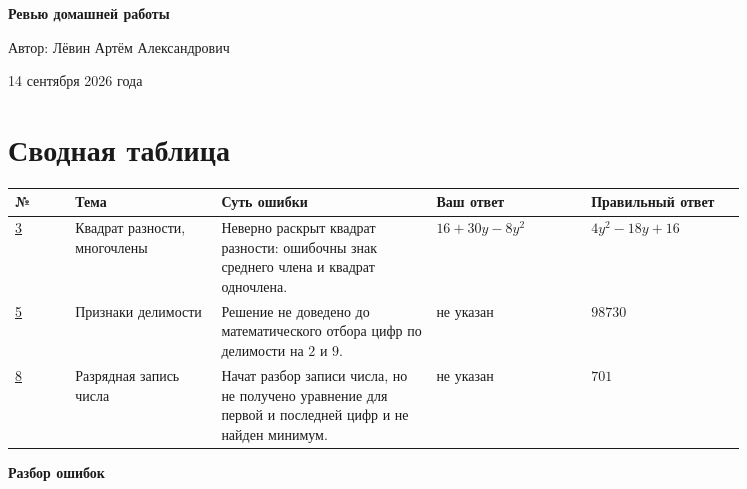 \documentclass[12pt,a4paper]{article}
\begin{document}
\hypersetup{pageanchor=false}
\begin{titlepage}
  \centering
  \vspace*{0.22\textheight}
  {\Huge\bfseries Ревью домашней работы\par}
  \vspace{2.2cm}
  {\Large Автор: Лёвин Артём Александрович\par}
  \vspace{1cm}
  {\large 14 сентября 2026 года\par}
  \vfill
  \vspace*{0.8cm}
\end{titlepage}
\hypersetup{pageanchor=true}

\newpage
\section*{Сводная таблица}
\small
\setlength{\tabcolsep}{3pt}
\begin{tabular}{>{\centering\arraybackslash}p{0.07\linewidth}
                p{0.17\linewidth}
                p{0.25\linewidth}
                p{0.18\linewidth}
                p{0.18\linewidth}}
\toprule
\textbf{№} & \textbf{Тема} & \textbf{Суть ошибки} & \textbf{Ваш ответ} & \textbf{Правильный ответ} \\
\midrule
\hyperref[task:3]{3} & Квадрат разности, многочлены & Неверно раскрыт квадрат разности: ошибочны знак среднего члена и квадрат одночлена. & $16+30y-8y^2$ & $4y^2-18y+16$ \\
\addlinespace
\hyperref[task:5]{5} & Признаки делимости & Решение не доведено до математического отбора цифр по делимости на $2$ и $9$. & не указан & $98730$ \\
\addlinespace
\hyperref[task:8]{8} & Разрядная запись числа & Начат разбор записи числа, но не получено уравнение для первой и последней цифр и не найден минимум. & не указан & $701$ \\
\bottomrule
\end{tabular}
\normalsize

\newpage
\vspace*{\fill}
\begin{center}
  {\Huge\bfseries Разбор ошибок}
\end{center}
\vspace*{\fill}
\end{document}
